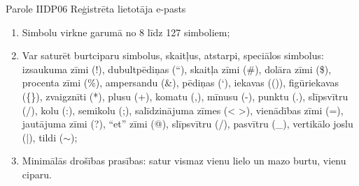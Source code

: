 \parameterTable
{Parole}
{IIDP06}
{
	Reģistrēta lietotāja e-pasts
}
{
	\begin{enumerate}
		\item Simbolu virkne garumā no 8 līdz 127 simboliem;
		\item Var saturēt burtciparu simbolus, skaitļus, atstarpi, speciālos simbolus:
		      izsaukuma zīmi (!), dubultpēdiņas (``), skaitļa zīmi (\#), dolāra zīmi (\$),
		      procenta zīmi (\%), ampersandu (\&), pēdiņas (`), iekavas (()), figūriekavas (\{\}), zvaigznīti (*),
		      plusu (+), komatu (,), mīnusu (-), punktu (.), slīpsvītru (/), kolu (:), semikolu (;),
		      salīdzinājuma zīmes (< >), vienādības zīmi (=), jautājuma zīmi (?), ``et'' zīmi (@),
		      slīpsvītru (/), pasvītru (\_), vertikālo joslu (|), tildi ($\sim$); %
		\item Minimālās drošības prasības: satur vismaz vienu lielo un mazo burtu, vienu ciparu.
	\end{enumerate}
}
{
}
